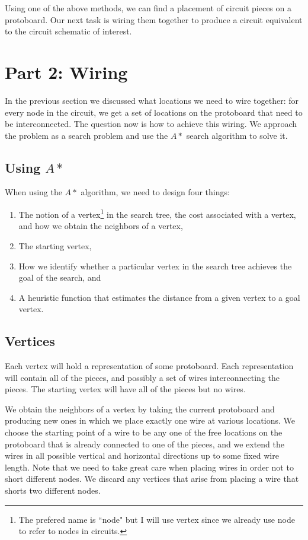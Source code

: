 Using one of the above methods, we can find a placement of circuit pieces on a
protoboard. Our next task is wiring them together to produce a circuit
equivalent to the circuit schematic of interest.

\section{Part 2: Wiring}

In the previous section we discussed what locations we need to wire together:
for every node in the circuit, we get a set of locations on the protoboard that
need to be interconnected. The question now is how to achieve this wiring. We
approach the problem as a search problem and use the $A*$ search algorithm to
solve it.

\subsection{Using $A*$}

When using the $A*$ algorithm, we need to design four things:

\begin{enumerate}
\item The notion of a vertex\footnote{The prefered name is ``node" but I will
use vertex since we already use node to refer to nodes in circuits.} in the
search tree, the cost associated with a vertex, and how we obtain the neighbors
of a vertex,
\item The starting vertex,
\item How we identify whether a particular vertex in the search tree achieves
the goal of the search, and
\item A heuristic function that estimates the distance from a given vertex to a
goal vertex.
\end{enumerate}

\subsection{Vertices}

Each vertex will hold a representation of some protoboard. Each representation
will contain all of the pieces, and possibly a set of wires interconnecting the
pieces. The starting vertex will have all of the pieces but no wires.

We obtain the neighbors of a vertex by taking the current protoboard and
producing new ones in which we place exactly one wire at various locations. We
choose the starting point of a wire to be any one of the free locations on the
protoboard that is already connected to one of the pieces, and we extend the
wires in all possible vertical and horizontal directions up to some fixed wire
length. Note that we need
to take great care when placing wires in order not to short different nodes. We
discard any vertices that arise from placing a wire that shorts two different
nodes.

